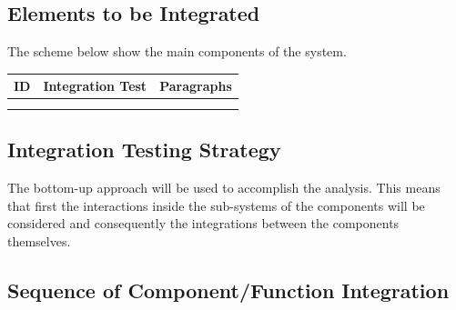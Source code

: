 \documentclass[a4paper,11pt]{report} %
\begin{document}
	\subsection{Elements to be Integrated}
		The scheme below show the main components of the system.\\
			\begin{minipage}{\linewidth}
			\end{minipage}
			\begin{center}
				\begin{tabular}{ l | p{2.5cm} | p{9cm} }\hline
					\multicolumn{1}{c|}{\textbf{ID}} & \multicolumn{1}{|c|}{\textbf{Integration Test}} & \textbf{Paragraphs}\\\hline
					 & & \\\hline
					& & \\\hline
				\end{tabular}
			\end{center}			
	\subsection{Integration Testing Strategy}
		The bottom-up approach will be used to accomplish the analysis. This means that first the interactions inside the sub-systems of the components will be considered and consequently the integrations between the components themselves.
	\subsection{Sequence of Component/Function Integration}
\end{document}
